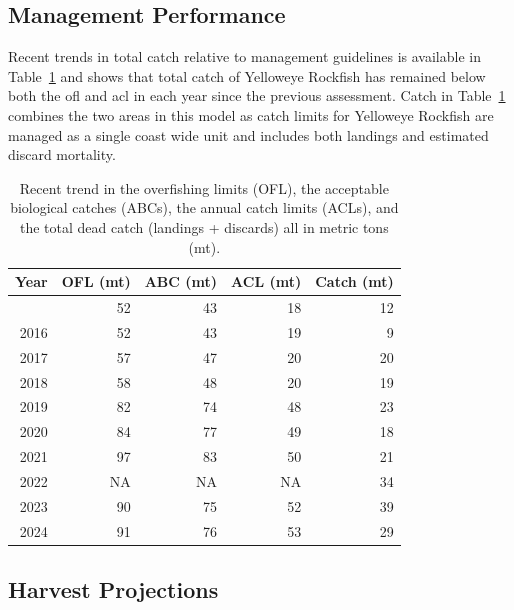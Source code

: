 \documentclass[
]{scrartcl}
\begin{document}
\clearpage

\subsection*{Management Performance}\label{management-performance}

Recent trends in total catch relative to management guidelines is
available in Table~\ref{tbl-es-management} and shows that total catch of
Yelloweye Rockfish has remained below both the \gls{ofl} and \gls{acl}
in each year since the previous assessment. Catch in
Table~\ref{tbl-es-management} combines the two areas in this model as
catch limits for Yelloweye Rockfish are managed as a single coast wide
unit and includes both landings and estimated discard mortality.

\begingroup
\fontsize{9.0pt}{10.8pt}\selectfont

\begin{longtable}{rrrrr}

\caption{\label{tbl-es-management}Recent trend in the overfishing limits
(OFL), the acceptable biological catches (ABCs), the annual catch limits
(ACLs), and the total dead catch (landings + discards) all in metric
tons (mt).}

\tabularnewline

\toprule
Year & OFL (mt) & ABC (mt) & ACL (mt) & Catch (mt) \\ 
\midrule\addlinespace[2.5pt]
2015 & 52 & 43 & 18 & 12 \\ 
2016 & 52 & 43 & 19 & 9 \\ 
2017 & 57 & 47 & 20 & 20 \\ 
2018 & 58 & 48 & 20 & 19 \\ 
2019 & 82 & 74 & 48 & 23 \\ 
2020 & 84 & 77 & 49 & 18 \\ 
2021 & 97 & 83 & 50 & 21 \\ 
2022 & NA & NA & NA & 34 \\ 
2023 & 90 & 75 & 52 & 39 \\ 
2024 & 91 & 76 & 53 & 29 \\ 
\bottomrule

\end{longtable}

\endgroup

\subsection*{Harvest Projections}\label{harvest-projections}
\end{document}

